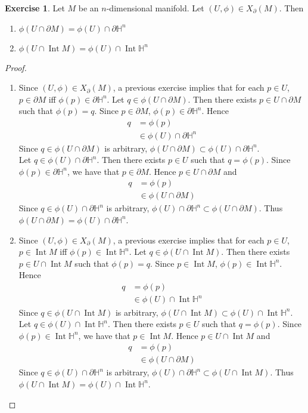 \documentclass[12pt]{amsart}
\theoremstyle{definition}
\newtheorem{ex}[definition]{Exercise}
\renewcommand{\H}{\mathbb{H}}
\newcommand{\p}{\partial}
\DeclareMathOperator{\Int}{Int}
\begin{document}
	\begin{ex}
		Let $M$ be an $n$-dimensional manifold. Let $(U, \phi) \in X_{\p}(M)$. Then 
		\begin{enumerate}
			\item $\phi(U \cap \p M) = \phi(U) \cap \p \H^n$ 
			\item $\phi(U \cap \Int M) = \phi(U) \cap \Int \H^n$ 
		\end{enumerate}
	\end{ex}

	\begin{proof} \
		\begin{enumerate}
			\item Since $(U, \phi) \in X_{\p}(M)$, a previous exercise implies that for each $p \in U$, $p \in \p M$ iff $\phi(p) \in \p \H^n$. Let $q \in \phi(U \cap \p M)$. Then there exists $p \in U \cap \p M$ such that $\phi(p) = q$. Since $p \in \p M$, $\phi(p) \in \p \H^n$. Hence 
			\begin{align*}
				q 
				& = \phi(p) \\
				& \in \phi(U) \cap \p \H^n
			\end{align*}
			Since $q \in \phi(U \cap \p M)$ is arbitrary, $\phi(U \cap \p M) \subset \phi(U) \cap \p \H^n$. \\
			Let $q \in \phi(U) \cap \p \H^n$. Then there exists $p \in U$ such that $q = \phi(p)$. Since $\phi(p) \in \p \H^n$, we have that $p \in \p M$. Hence $p \in U \cap \p M$ and 
			\begin{align*}
				q 
				& = \phi(p) \\
				& \in \phi(U \cap \p M)
			\end{align*}
			Since $q \in \phi(U) \cap \p \H^n$ is arbitrary, $\phi(U) \cap \p \H^n \subset \phi(U \cap \p M)$. Thus $\phi(U \cap \p M) = \phi(U) \cap \p \H^n$.
			\item Since $(U, \phi) \in X_{\p}(M)$, a previous exercise implies that for each $p \in U$, $p \in \Int M$ iff $\phi(p) \in \Int \H^n$.  Let $q \in \phi(U \cap \Int M)$. Then there exists $p \in U \cap \Int M$ such that $\phi(p) = q$. Since $p \in \Int M$, $\phi(p) \in \Int \H^n$. Hence 
			\begin{align*}
				q 
				& = \phi(p) \\
				& \in \phi(U) \cap \Int \H^n
			\end{align*}
			Since $q \in \phi(U \cap \Int M)$ is arbitrary, $\phi(U \cap \Int M) \subset \phi(U) \cap \Int \H^n$. \\
			Let $q \in \phi(U) \cap \Int \H^n$. Then there exists $p \in U$ such that $q = \phi(p)$. Since $\phi(p) \in \Int \H^n$, we have that $p \in \Int M$. Hence $p \in U \cap \Int M$ and 
			\begin{align*}
				q 
				& = \phi(p) \\
				& \in \phi(U \cap \p M)
			\end{align*}
			Since $q \in \phi(U) \cap \p \H^n$ is arbitrary, $\phi(U) \cap \p \H^n \subset \phi(U \cap \Int M)$. Thus $\phi(U \cap \Int M) = \phi(U) \cap \Int \H^n$.
		\end{enumerate}
	\end{proof}
\end{document}
